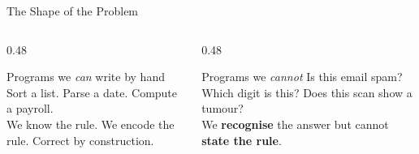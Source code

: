 \documentclass[aspectratio=169]{beamer}
\begin{document}
\begin{frame}[shrink=8]{The Shape of the Problem}
  \begin{columns}[T]
    \begin{column}{0.48\textwidth}
      \begin{block}{Programs we \emph{can} write by hand}
        Sort a list. Parse a date. Compute a payroll.\\[3pt]
        We know the rule. We encode the rule. Correct by construction.
      \end{block}
    \end{column}
    \begin{column}{0.48\textwidth}
      \begin{alertblock}{Programs we \emph{cannot}}
        Is this email spam? Which digit is this? Does this scan show a tumour?\\[3pt]
        We \textbf{recognise} the answer but cannot \textbf{state the rule}.
      \end{alertblock}
    \end{column}
  \end{columns}
  \vspace{0.4em}
  \vspace{0.2em}
\end{frame}
\end{document}
